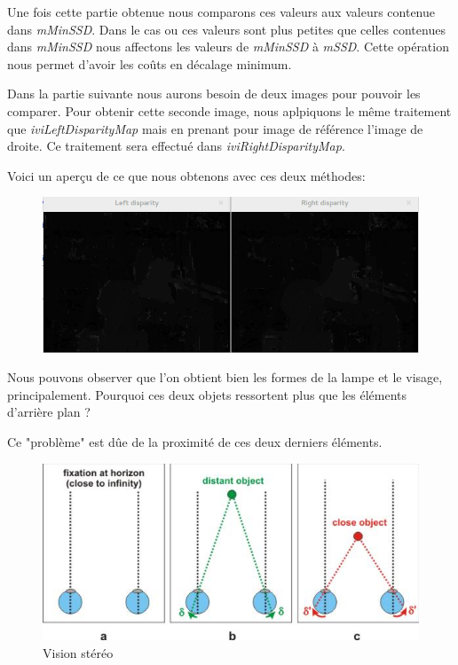 \documentclass[a4paper,12pt]{report}
\begin{document}
Une fois cette partie obtenue nous comparons ces valeurs aux valeurs contenue dans \textit{mMinSSD}. Dans le cas ou ces valeurs sont plus petites que celles contenues dans \textit{mMinSSD} nous affectons les valeurs de \textit{mMinSSD} à \textit{mSSD}. Cette opération nous permet d'avoir les coûts en décalage minimum.

Dans la partie suivante nous aurons besoin de deux images pour pouvoir les comparer. Pour obtenir cette seconde image, nous aplpiquons le même traitement que \textit{iviLeftDisparityMap} mais en prenant pour image de référence l'image de droite. Ce traitement sera effectué dans \textit{iviRightDisparityMap}.

Voici un aperçu de ce que nous obtenons avec ces deux méthodes:

\begin{figure}[!ht]
	\center
	\includegraphics[scale=0.6]{./image/disparity.png}
\end{figure}

Nous pouvons observer que l'on obtient bien les formes de la lampe et le visage, principalement. Pourquoi ces deux objets ressortent plus que les éléments d'arrière plan ?

Ce "problème" est dûe de la proximité de ces deux derniers éléments.

\begin{figure}[!ht]
	\center
	\includegraphics[scale=2]{./image/stereo.jpg}
	\caption{Vision stéréo}
\end{figure}
\end{document}
